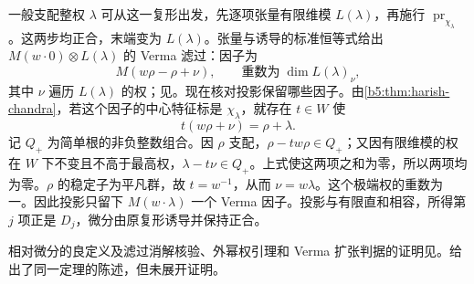 \begin{proofsketch}
	一般支配整权 \(\lambda\) 可从这一复形出发，先逐项张量有限维模 \(L(\lambda)\)，再施行 \(\operatorname{pr}_{\chi_\lambda}\)。这两步均正合，末端变为 \(L(\lambda)\)。张量与诱导的标准恒等式给出 \(M(w\mathbin{\cdot}0)\otimes L(\lambda)\) 的 Verma 滤过：因子为
	\[
		M(w\rho-\rho+\nu), \qquad \text{重数为}\;\dim L(\lambda)_\nu,
	\]
	其中 \(\nu\) 遍历 \(L(\lambda)\) 的权；见\cite[Section 3.6]{Humphreys2008BGGCategoryO}。现在核对投影保留哪些因子。由\cref{b5:thm:harish-chandra}，若这个因子的中心特征标是 \(\chi_\lambda\)，就存在 \(t\in W\) 使
	\[
		t(w\rho+\nu)=\rho+\lambda.
	\]
	记 \(Q_+\) 为简单根的非负整数组合。因 \(\rho\) 支配，\(\rho-tw\rho\in Q_+\)；又因有限维模的权在 \(W\) 下不变且不高于最高权，\(\lambda-t\nu\in Q_+\)。上式使这两项之和为零，所以两项均为零。\(\rho\) 的稳定子为平凡群，故 \(t=w^{-1}\)，从而 \(\nu=w\lambda\)。这个极端权的重数为一。因此投影只留下 \(M(w\mathbin{\cdot}\lambda)\) 一个 Verma 因子。投影与有限直和相容，所得第 \(j\) 项正是 \(D_j\)，微分由原复形诱导并保持正合。

	相对微分的良定义及滤过消解核验、外幂权引理和 Verma 扩张判据的证明见\cite[Sections 6.2--6.5]{Humphreys2008BGGCategoryO}。\cite[Section 8.4, Theorem 8.30]{Kirillov2008LieGroups}给出了同一定理的陈述，但未展开证明。
\end{proofsketch}

